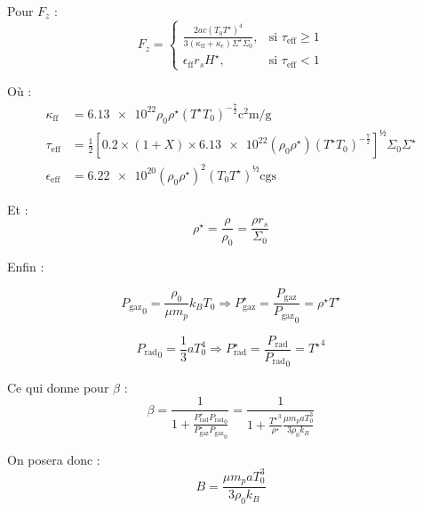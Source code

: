 Pour $F_z$ :
\begin{equation}
    F_z =
    \begin{cases}
        \frac{2 a c \left(T_0 T^\star\right)^4}{3 (\kappa_\mathrm{ff} + \kappa_e)\Sigma^\star \Sigma_0}, &\text{si $\tau_\mathrm{eff} \geq 1$} \\
        \epsilon_\mathrm{ff} r_s H^\star, &\text{si $\tau_\mathrm{eff} < 1$}
    \end{cases}
\end{equation}

Où :
\begin{align}
    \kappa_\mathrm{ff} &= \num{6.13e22} \rho_0 \rho^\star \left(T^\star T_0\right)^{-\frac{7}{2}} \si{\square\centi\meter\per\gram} \\
    \tau_\mathrm{eff} &= \frac{1}{2} \left[ \num{0.2} × (1 + X) × \num{6.13e22} \left(\rho_0 \rho^\star\right) \left(T^\star T_0\right)^{-\frac{7}{2}} \right]^½ \Sigma_0 \Sigma^\star \\
    \epsilon_\mathrm{eff} &= \num{6.22e20} (\rho_0 \rho^\star)^2 (T_0 T^\star)^½ \text{cgs}
\end{align}

Et :
\begin{equation}
    \rho^\star = \frac{\rho}{\rho_0} = \frac{\rho r_s}{\Sigma_0}
\end{equation}

Enfin :

\begin{equation}
    {P_\mathrm{gaz}}_0 = \frac{\rho_0}{\mu m_p} k_B T_0 \Rightarrow P_\mathrm{gaz}^\star = \frac{P_\mathrm{gaz}}{{P_\mathrm{gaz}}_0} = \rho^\star T^\star
\end{equation}

\begin{equation}
    {P_\mathrm{rad}}_0 = \frac{1}{3} a T_0^4 \Rightarrow P_\mathrm{rad}^\star = \frac{P_\mathrm{rad}}{{P_\mathrm{rad}}_0} = {T^\star}^4
\end{equation}

Ce qui donne pour $\beta$ :
\begin{equation}
    \beta = \frac{1}{1 + \frac{P_\mathrm{rad}^\star {P_\mathrm{rad}}_0}{P_\mathrm{gaz}^\star {P_\mathrm{gaz}}_0}} = \frac{1}{1 + \frac{{T^\star}^3}{\rho^\star} \frac{\mu m_p a T_0^3}{3 \rho_0 k_B}}
\end{equation}

On posera donc :
\begin{equation}
    B = \frac{\mu m_p a T_0^3}{3 \rho_0 k_B}
\end{equation}


